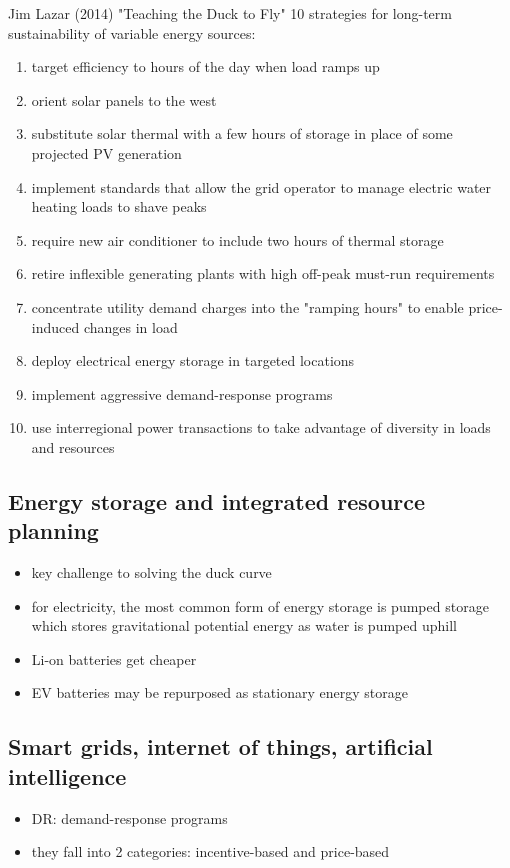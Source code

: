 Jim Lazar (2014) "Teaching the Duck to Fly" 10 strategies for long-term
sustainability of variable energy sources:
\begin{enumerate}
	\item target efficiency to hours of the day when load ramps up
	\item orient solar panels to the west
	\item substitute solar thermal with a few hours of storage in place
	of some projected PV generation
	\item implement standards that allow the grid operator to manage
	electric water heating loads to shave peaks
	\item require new air conditioner to include two hours of thermal
	storage
	\item retire inflexible generating plants with high off-peak must-run
	requirements
	\item concentrate utility demand charges into the "ramping hours" to
	enable price-induced changes in load
	\item deploy electrical energy storage in targeted locations
	\item implement aggressive demand-response programs
	\item use interregional power transactions to take advantage of
	diversity in loads and resources
\end{enumerate}

\subsection{Energy storage and integrated resource planning}
\begin{itemize}
	\item key challenge to solving the duck curve
	\item for electricity, the most common form of energy storage is
	pumped storage which stores gravitational potential energy as water
	is pumped uphill
	\item Li-on batteries get cheaper
	\item EV batteries may be repurposed as stationary energy storage
\end{itemize}

\subsection{Smart grids, internet of things, artificial intelligence}
\begin{itemize}
	\item DR: demand-response programs
	\item they fall into 2 categories: incentive-based and price-based
\end{itemize}
